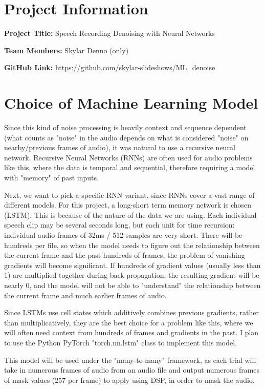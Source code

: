 \documentclass[11pt, letterpaper]{article}
\begin{document}
\section*{Project Information}

\noindent \textbf{Project Title:} Speech Recording Denoising with Neural Networks

\noindent\textbf{Team Members:} Skylar Denno (only)

\noindent\textbf{GitHub Link:} https://github.com/skylar-slideshows/ML\_denoise

\section{Choice of Machine Learning Model}

Since this kind of noise processing is heavily context and sequence dependent (what counts as "noise" in the audio depends on what is considered "noise" on nearby/previous frames of audio), it was natural to use a recursive neural network. Recursive Neural Networks (RNNs) are often used for audio problems like this, where the data is temporal and sequential, therefore requiring a model with "memory" of past inputs.

Next, we want to pick a specific RNN variant, since RNNs cover a vast range of different models. For this project, a long-short term memory network is chosen (LSTM). This is because of the nature of the data we are using. Each individual speech clip may be several seconds long, but each unit for time recursion: individual audio frames of 32ms / 512 samples are very short. There will be hundreds per file, so when the model needs to figure out the relationship between the current frame and the past hundreds of frames, the problem of vanishing gradients will become significant. If hundreds of gradient values (usually less than 1) are multiplied together during back propagation, the resulting gradient will be nearly 0, and the model will not be able to "understand" the relationship between the current frame and much earlier frames of audio.

Since LSTMs use cell states which additively combines previous gradients, rather than multiplicatively, they are the best choice for a problem like this, where we will often need context from hundreds of frames and gradients in the past. I plan to use the Python PyTorch "torch.nn.lstm" class to implement this model.

This model will be used under the "many-to-many" framework, as each trial will take in numerous frames of audio from an audio file and output numerous frames of mask values (257 per frame) to apply using DSP, in order to mask the audio.
\end{document}
